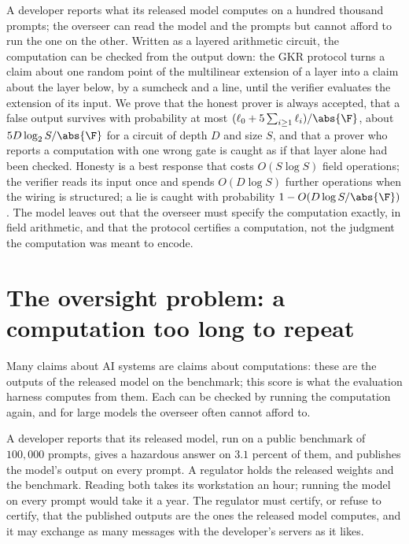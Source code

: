 \newcommand{\delegationadd}{\widetilde{\mathrm{add}}}
\newcommand{\delegationmult}{\widetilde{\mathrm{mult}}}
\newcommand{\delegationeq}{\mathrm{eq}}

\begin{refsection}

\begin{chaptersummary}
A developer reports what its released model computes on a hundred thousand prompts; the overseer can read the model and the prompts but cannot afford to run the one on the other. Written as a layered arithmetic circuit, the computation can be checked from the output down: the GKR protocol turns a claim about one random point of the multilinear extension of a layer into a claim about the layer below, by a sumcheck and a line, until the verifier evaluates the extension of its input. We prove that the honest prover is always accepted, that a false output survives with probability at most $(\ell_0+5\sum_{i\ge1}\ell_i)/\abs{\F}$, about $5D\log_2S/\abs{\F}$ for a circuit of depth $D$ and size $S$, and that a prover who reports a computation with one wrong gate is caught as if that layer alone had been checked. Honesty is a best response that costs $O(S\log S)$ field operations; the verifier reads its input once and spends $O(D\log S)$ further operations when the wiring is structured; a lie is caught with probability $1-O(D\log S/\abs{\F})$. The model leaves out that the overseer must specify the computation exactly, in field arithmetic, and that the protocol certifies a computation, not the judgment the computation was meant to encode.
\end{chaptersummary}

\section{The oversight problem: a computation too long to repeat}\label{sec:delegation:problem}

Many claims about AI systems are claims about computations: these are the outputs of the released model on the benchmark; this score is what the evaluation harness computes from them. Each can be checked by running the computation again, and for large models the overseer often cannot afford to.

\begin{oversight}
A developer reports that its released model, run on a public benchmark of $100{,}000$ prompts, gives a hazardous answer on $3.1$ percent of them, and publishes the model's output on every prompt. A regulator holds the released weights and the benchmark. Reading both takes its workstation an hour; running the model on every prompt would take it a year. The regulator must certify, or refuse to certify, that the published outputs are the ones the released model computes, and it may exchange as many messages with the developer's servers as it likes.
\end{oversight}


\end{refsection}
